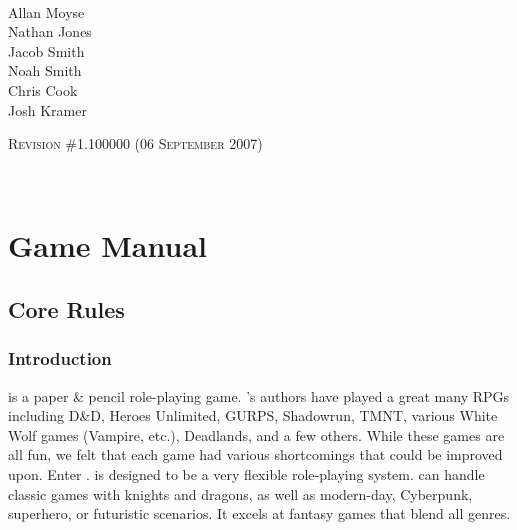 \documentclass[twoside]{book}
\begin{document}
\begin{titlepage}
~\\~\\~\\~\\~\\~\\~\\~\\~\\~\\
\begin{center}
\ARPG \\

\hspace*{6em}
\vbox{\vspace{-2em}
\small Allan Moyse \\
Nathan Jones \\
Jacob Smith \\
Noah Smith \\
Chris Cook \\
Josh Kramer}

\vskip 2in
\textsc{Revision \#1.100000 (06 September 2007)}
\end{center}

\end{titlepage}

~
\setcounter{page}{1}
\setcounter{tocdepth}{3}
\tableofcontents
\newpage
\listoftables
\newpage
\listoffigures
\newpage
{}
\setcounter{page}{1}


  
    

\part{Game Manual}
    
    

\chapter{Core Rules}
    
    

\section{Introduction}
    
    {  
    \APATHY{}  is a paper \& pencil role-playing game.
            \APATHY{}'s authors have played a great many RPGs
            including D\&D, Heroes Unlimited, GURPS, Shadowrun, TMNT,
            various White Wolf games (Vampire, etc.), Deadlands, and a
            few others. While these games are all fun, we felt that each
            game had various shortcomings that could be improved upon.
            Enter \APATHY{}. \APATHY{}  is designed to be a very
            flexible role-playing system. \APATHY{}  can handle classic
            games with knights and dragons, as well as modern-day,
            Cyberpunk, superhero, or futuristic scenarios. It excels at
            fantasy games that blend all genres.
          
    }
  
\end{document}
